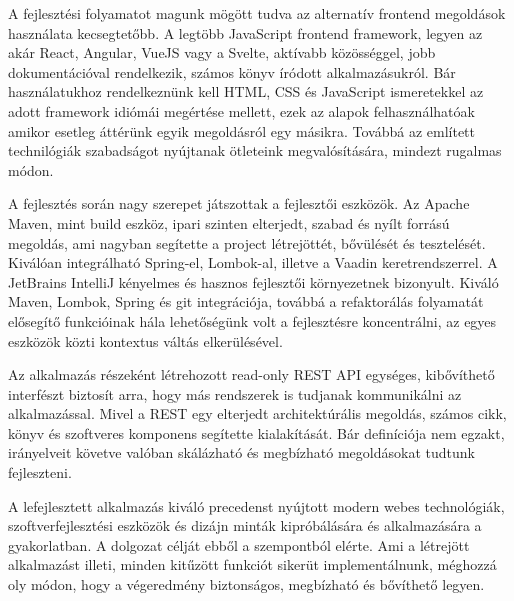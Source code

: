 A fejlesztési folyamatot magunk mögött tudva az alternatív frontend megoldások használata kecsegtetőbb. A legtöbb JavaScript frontend framework, legyen az akár React, Angular, VueJS vagy a Svelte, aktívabb közösséggel, jobb dokumentációval rendelkezik, számos könyv íródott alkalmazásukról. Bár használatukhoz rendelkeznünk kell HTML, CSS és JavaScript ismeretekkel az adott framework idiómái megértése mellett, ezek az alapok felhasználhatóak amikor esetleg áttérünk egyik megoldásról egy másikra. Továbbá az említett technilógiák szabadságot nyújtanak ötleteink megvalósítására, mindezt rugalmas módon. \par

A fejlesztés során nagy szerepet játszottak a fejlesztői eszközök. Az Apache Maven, mint build eszköz, ipari szinten elterjedt, szabad és nyílt forrású megoldás, ami nagyban segítette a project létrejöttét, bővülését és tesztelését. Kiválóan integrálható Spring-el, Lombok-al, illetve a Vaadin keretrendszerrel. A JetBrains IntelliJ kényelmes és hasznos fejlesztői környezetnek bizonyult. Kiváló Maven, Lombok, Spring és git integrációja, továbbá a refaktorálás folyamatát elősegítő funkcióinak hála lehetőségünk volt a fejlesztésre koncentrálni, az egyes eszközök közti kontextus váltás elkerülésével. \par

Az alkalmazás részeként létrehozott read-only REST API egységes, kibővíthető interfészt biztosít arra, hogy más rendszerek is tudjanak kommunikálni az alkalmazással. Mivel a REST egy elterjedt architektúrális megoldás, számos cikk, könyv és szoftveres komponens segítette kialakítását. Bár definíciója nem egzakt, irányelveit követve valóban skálázható és megbízható megoldásokat tudtunk fejleszteni. \par

A lefejlesztett alkalmazás kiváló precedenst nyújtott modern webes technológiák, szoftverfejlesztési eszközök és dizájn minták kipróbálására és alkalmazására a gyakorlatban. A dolgozat célját ebből a szempontból elérte. Ami a létrejött alkalmazást illeti, minden kitűzött funkciót sikerüt implementálnunk, méghozzá oly módon, hogy a végeredmény biztonságos, megbízható és bővíthető legyen.